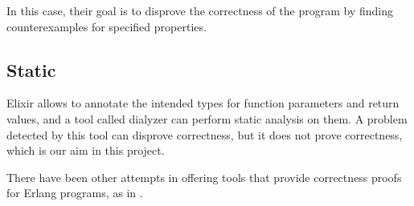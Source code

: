 In this case, their goal is to disprove the correctness of the program by
finding counterexamples for specified properties.

\subsection{Static}

Elixir allows to annotate the intended types for function parameters and return
values, and a tool called \gls{dialyzer} \citep{Dialyzer} can perform static
analysis on them. A problem detected by this tool can disprove correctness, but
it does not prove correctness, which is our aim in this project.

There have been other attempts in offering tools that provide correctness proofs
for Erlang programs, as in \cite{erlangveri}.

